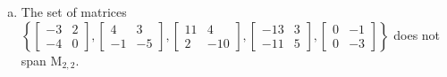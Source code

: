 \begin{exerciseAnswer}
\begin{enumerate}[(a)]
\begin{center}
\begin{minipage}{0.8\textwidth}
\[\begin{array}{cc}
4 & 3 \\
-1 & -5
\end{array}\right] + y_{3} \left[\begin{array}{cc}
11 & 4 \\
2 & -10
\end{array}\right] + y_{4} \left[\begin{array}{cc}
-13 & 3 \\
-11 & 5
\end{array}\right] + y_{5} \left[\begin{array}{cc}
0 & -1 \\
0 & -3
\end{array}\right] =B\] has a solution for every \(B \in \mathrm{M}_{2,2}\). 
\end{minipage}\end{center}
    
\item The set of matrices \( \left\{ \left[\begin{array}{cc}
-3 & 2 \\
-4 & 0
\end{array}\right] , \left[\begin{array}{cc}
4 & 3 \\
-1 & -5
\end{array}\right] , \left[\begin{array}{cc}
11 & 4 \\
2 & -10
\end{array}\right] , \left[\begin{array}{cc}
-13 & 3 \\
-11 & 5
\end{array}\right] , \left[\begin{array}{cc}
0 & -1 \\
0 & -3
\end{array}\right] \right\} \) does not span \(\mathrm{M}_{2,2}\). 
\end{enumerate}
    
\end{exerciseAnswer}
    

